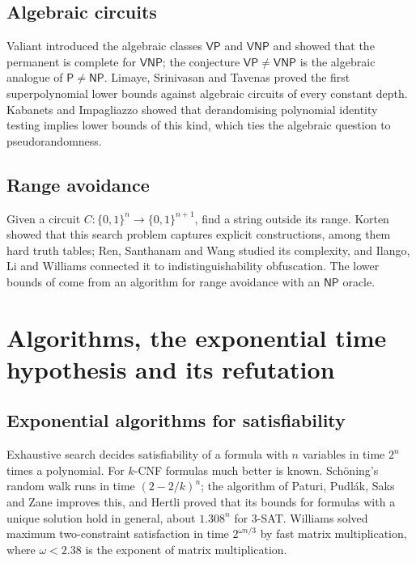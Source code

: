 \documentclass[11pt,reqno]{amsart}
\numberwithin{equation}{section}
\theoremstyle{plain}
\theoremstyle{definition}
\theoremstyle{remark}
\newcommand{\Pc}{\mathsf{P}}
\newcommand{\NP}{\mathsf{NP}}
\begin{document}
\subsection{Algebraic circuits}
Valiant \cite{Val79a} introduced the algebraic classes $\mathsf{VP}$ and
$\mathsf{VNP}$ and showed that the permanent is complete for $\mathsf{VNP}$; the
conjecture $\mathsf{VP}\ne\mathsf{VNP}$ is the algebraic analogue of $\Pc\ne\NP$.
Limaye, Srinivasan and Tavenas \cite{LST21} proved the first superpolynomial
lower bounds against algebraic circuits of every constant depth. Kabanets and
Impagliazzo \cite{KI04} showed that derandomising polynomial identity testing
implies lower bounds of this kind, which ties the algebraic question to
pseudorandomness.

\subsection{Range avoidance}
Given a circuit $C:\{0,1\}^n\to\{0,1\}^{n+1}$, find a string outside its range.
Korten \cite{Kor21} showed that this search problem captures explicit
constructions, among them hard truth tables; Ren, Santhanam and Wang
\cite{RSW22} studied its complexity, and Ilango, Li and Williams \cite{ILW23}
connected it to indistinguishability obfuscation. The lower bounds of
\cite{CHR24,Li24} come from an algorithm for range avoidance with an $\NP$
oracle.

\section{Algorithms, the exponential time hypothesis and its refutation}\label{sec:algorithms}

\subsection{Exponential algorithms for satisfiability}
Exhaustive search decides satisfiability of a formula with $n$ variables in
time $2^n$ times a polynomial. For $k$-CNF formulas much better is known.
Sch\"oning's random walk \cite{Sch99} runs in time $(2-2/k)^n$; the algorithm of
Paturi, Pudl\'ak, Saks and Zane \cite{PPSZ05} improves this, and Hertli
\cite{Her14} proved that its bounds for formulas with a unique solution hold in
general, about $1.308^n$ for $3$-SAT. Williams \cite{Wil05} solved maximum
two-constraint satisfaction in time $2^{\omega n/3}$ by fast matrix
multiplication, where $\omega<2.38$ is the exponent of matrix multiplication.
\end{document}
